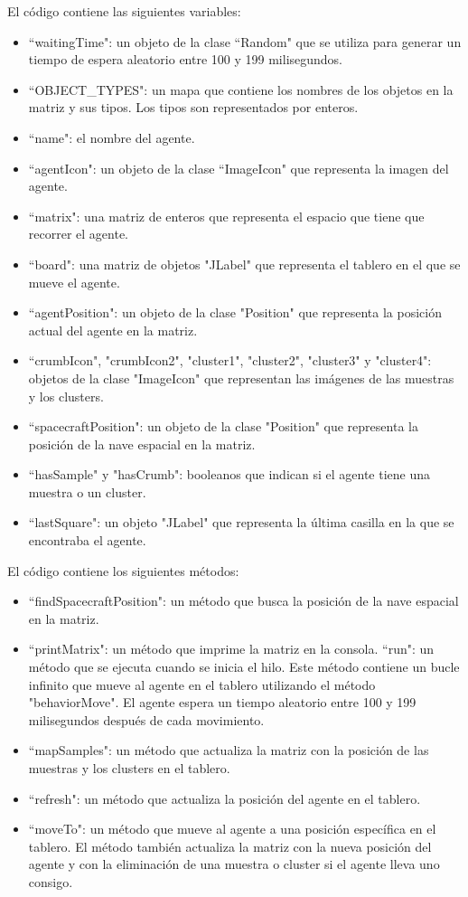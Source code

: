 \documentclass{article}
\begin{document}
El código contiene las siguientes variables:
\begin{itemize}
	\item ``waitingTime": un objeto de la clase ``Random" que se utiliza para generar un tiempo de espera aleatorio entre 100 y 199 milisegundos.
	\item ``OBJECT\_TYPES": un mapa que contiene los nombres de los objetos en la matriz y sus tipos. Los tipos son representados por enteros.
	\item ``name": el nombre del agente.
	\item ``agentIcon": un objeto de la clase ``ImageIcon" que representa la imagen del agente.
	\item ``matrix": una matriz de enteros que representa el espacio que tiene que recorrer el agente.
    
	\item ``board": una matriz de objetos "JLabel" que representa el tablero en el que se mueve el agente.
    
	\item ``agentPosition": un objeto de la clase "Position" que representa la posición actual del agente en la matriz.
    
	\item ``crumbIcon", "crumbIcon2", "cluster1", "cluster2", "cluster3" y "cluster4": objetos de la clase "ImageIcon" que representan las imágenes de las muestras y los clusters.
    
	\item ``spacecraftPosition": un objeto de la clase "Position" que representa la posición de la nave espacial en la matriz.
    
	\item ``hasSample" y "hasCrumb": booleanos que indican si el agente tiene una muestra o un cluster.
    
	\item ``lastSquare": un objeto "JLabel" que representa la última casilla en la que se encontraba el agente.
\end{itemize}
El código contiene los siguientes métodos:
\begin{itemize}
	\item ``findSpacecraftPosition": un método que busca la posición de la nave espacial en la matriz.
    \item ``printMatrix": un método que imprime la matriz en la consola.
    ``run": un método que se ejecuta cuando se inicia el hilo. Este método contiene un bucle infinito que mueve al agente en el tablero utilizando el método "behaviorMove". El agente espera un tiempo aleatorio entre 100 y 199 milisegundos después de cada movimiento.
    \item ``mapSamples": un método que actualiza la matriz con la posición de las muestras y los clusters en el tablero.
    \item ``refresh": un método que actualiza la posición del agente en el tablero.
    \item ``moveTo": un método que mueve al agente a una posición específica en el tablero. El método también actualiza la matriz con la nueva posición del agente y con la eliminación de una muestra o cluster si el agente lleva uno consigo.
\end{itemize}
\end{document}
